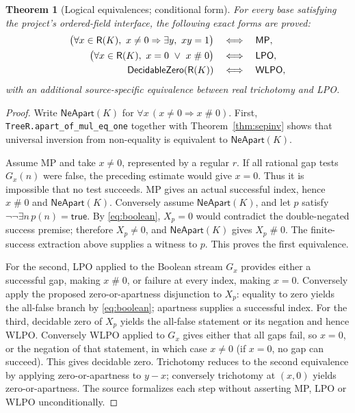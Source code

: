 \documentclass[11pt,reqno]{amsart}
\newtheorem{theorem}{Theorem}[section]
\theoremstyle{definition}\newtheorem{definition}[theorem]{Definition}
\theoremstyle{remark}\newtheorem{remark}[theorem]{Remark}
\newcommand{\Apt}{\mathrel{\#}}
\begin{document}
\begin{theorem}[Logical equivalences; conditional form]\label{thm:logical}
For every base satisfying the project's ordered-field interface, the following exact forms are proved:
\begin{align*}
\bigl(\forall x\in\RR(K),\ x\ne0\Rightarrow\exists y,\ xy=1\bigr)
&\quad\Longleftrightarrow\quad \mathsf{MP},\\
\bigl(\forall x\in\RR(K),\ x=0\ \lor\ x\Apt0\bigr)
&\quad\Longleftrightarrow\quad \mathsf{LPO},\\
\mathsf{DecidableZero}(\RR(K))&\quad\Longleftrightarrow\quad\mathsf{WLPO},
\end{align*}
with an additional source-specific equivalence between real trichotomy and LPO.
\end{theorem}
\begin{proof}
Write $\mathsf{NeApart}(K)$ for $\forall x\,(x\ne0\Rightarrow x\Apt0)$. First, \texttt{TreeR.apart\_of\_mul\_eq\_one} together with Theorem~\ref{thm:sepinv} shows that universal inversion from non-equality is equivalent to $\mathsf{NeApart}(K)$.

Assume MP and take $x\ne0$, represented by a regular $r$. If all rational gap tests $G_x(n)$ were false, the preceding estimate would give $x=0$. Thus it is impossible that no test succeeds. MP gives an actual successful index, hence $x\Apt0$ and $\mathsf{NeApart}(K)$. Conversely assume $\mathsf{NeApart}(K)$, and let $p$ satisfy $\neg\neg\exists n\,p(n)=\mathsf{true}$. By \eqref{eq:boolean}, $X_p=0$ would contradict the double-negated success premise; therefore $X_p\ne0$, and $\mathsf{NeApart}(K)$ gives $X_p\Apt0$. The finite-success extraction above supplies a witness to $p$. This proves the first equivalence.

For the second, LPO applied to the Boolean stream $G_x$ provides either a successful gap, making $x\Apt0$, or failure at every index, making $x=0$. Conversely apply the proposed zero-or-apartness disjunction to $X_p$: equality to zero yields the all-false branch by \eqref{eq:boolean}; apartness supplies a successful index. For the third, decidable zero of $X_p$ yields the all-false statement or its negation and hence WLPO. Conversely WLPO applied to $G_x$ gives either that all gaps fail, so $x=0$, or the negation of that statement, in which case $x\ne0$ (if $x=0$, no gap can succeed). This gives decidable zero. Trichotomy reduces to the second equivalence by applying zero-or-apartness to $y-x$; conversely trichotomy at $(x,0)$ yields zero-or-apartness. The source formalizes each step without asserting MP, LPO or WLPO unconditionally.
\end{proof}
\end{document}
